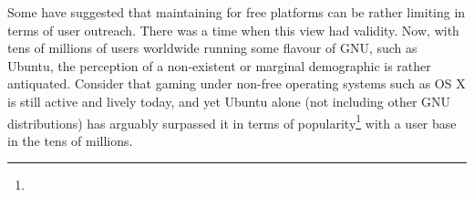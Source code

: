 Some have suggested that maintaining for free platforms can be rather limiting in terms of user outreach. There was a time when this view had validity. Now, with tens of millions of users worldwide running some flavour of GNU, such as Ubuntu, the perception of a non-existent or marginal demographic  is rather antiquated. Consider that gaming under non-free operating systems such as OS X is still active and lively today, and yet Ubuntu alone (not including other GNU distributions) has arguably surpassed it in terms of popularity\footnote{} with a user base in the tens of millions.

\StopChapter

